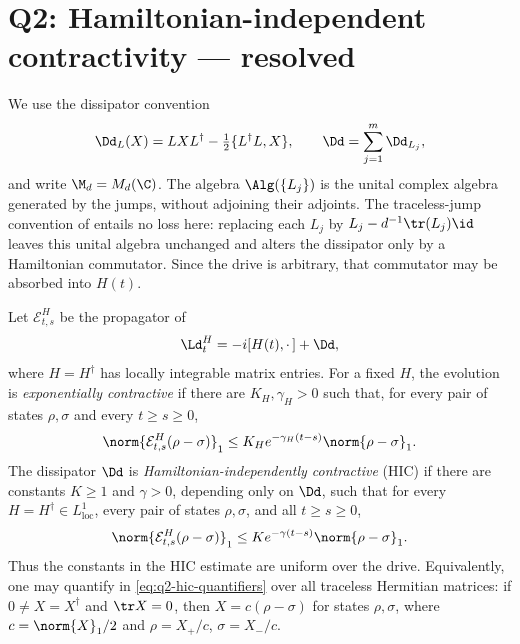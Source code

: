 \documentclass[class=article,11pt,a4paper,crop=false]{standalone}
\begin{document}
\section{Q2: Hamiltonian-independent contractivity --- resolved}
\label{sec:q2}

We use the dissipator convention
\begin{equation}
  \Dd_L(X)=LXL^\dagger-\tfrac12\{L^\dagger L,X\},
  \qquad
  \Dd=\sum_{j=1}^m\Dd_{L_j},
\end{equation}
and write $\M_d=M_d(\C)$. The algebra $\Alg(\{L_j\})$ is the unital
complex algebra generated by the jumps, without adjoining their adjoints.
The traceless-jump convention of \cite{Wolff2026Contractivity} entails no
loss here: replacing each $L_j$ by
$L_j-d^{-1}\tr(L_j)\id$ leaves this unital algebra unchanged and alters the
dissipator only by a Hamiltonian commutator. Since the drive is arbitrary,
that commutator may be absorbed into $H(t)$.

\begin{definition}
\label{def:q2-hic}
Let $\mathcal E^H_{t,s}$ be the propagator of
\begin{equation}
  \Ld^H_t=-i[H(t), \cdot\,]+\Dd,
\end{equation}
where $H=H^\dagger$ has locally integrable matrix entries. For a fixed $H$,
the evolution is \emph{exponentially contractive} if there are
$K_H,\gamma_H>0$ such that, for every pair of states $\rho,\sigma$ and every
$t\ge s\ge0$,
\begin{equation}
 \norm{\mathcal E^H_{t,s}(\rho-\sigma)}_1
 \le K_H e^{-\gamma_H(t-s)}\norm{\rho-\sigma}_1.
 \label{eq:q2-source-contractivity}
\end{equation}
The dissipator $\Dd$ is \emph{Hamiltonian-independently contractive} (HIC) if
there are constants $K\ge1$ and $\gamma>0$, depending only on $\Dd$, such
that for every $H=H^\dagger\in L^1_{\mathrm{loc}}$, every pair of states
$\rho,\sigma$, and all $t\ge s\ge0$,
\begin{equation}
 \norm{\mathcal E^H_{t,s}(\rho-\sigma)}_1
 \le K e^{-\gamma(t-s)}\norm{\rho-\sigma}_1.
 \label{eq:q2-hic-quantifiers}
\end{equation}
Thus the constants in the HIC estimate are uniform over the drive.
Equivalently, one may quantify in \eqref{eq:q2-hic-quantifiers} over all
traceless Hermitian matrices: if $0\ne X=X^\dagger$ and $\tr X=0$, then
$X=c(\rho-\sigma)$ for states $\rho,\sigma$, where
$c=\norm{X}_1/2$ and $\rho=X_+/c$, $\sigma=X_-/c$.
\end{definition}
\end{document}
